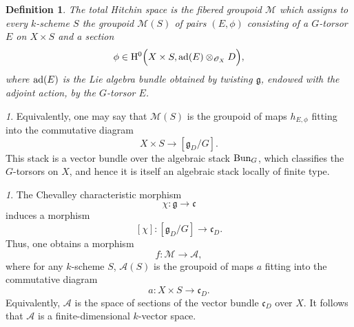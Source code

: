\documentclass[12pt,english]{smfart}
\numberwithin{equation}{subsection}
\newtheorem{definition}[equation]{Definition}
\theoremstyle{remark}
\newtheorem{numero}[equation]{}
\newcommand\calA{{\mathscr A}}
\newcommand\calM{{\mathscr M}}
\newcommand\calO{{\mathscr O}}
\newcommand\frakg{{\mathfrak g}}
\newcommand\frakc{{\mathfrak c}}
\newcommand\rmH{{\rm H}}
\newcommand\ad{{\rm ad}}
\begin{document}
\begin{definition}\label{definition fibration de Hitchin}
The total Hitchin space is the fibered groupoid $\calM$ which assigns to every $k$-scheme $S$ the groupoid $\calM(S)$ of pairs $(E,\phi)$ consisting of a $G$-torsor $E$ on $X\times S$ and a section
$$\phi\in\rmH^0\Bigl(X\times S,\ad(E)\otimes_{\calO_X} D\Bigr),$$
where $\ad(E)$ is the Lie algebra bundle obtained by twisting $\frakg$, endowed with the adjoint action, by the $G$-torsor $E$.
\end{definition}

\begin{numero}
Equivalently, one may say that $\calM(S)$ is the groupoid of maps $h_{E,\phi}$ fitting into the commutative diagram
$$
X\times S \longrightarrow [\frakg_D/ G].
$$
This stack is a vector bundle over the algebraic stack ${\rm Bun}_G$, which classifies the $G$-torsors on $X$, and hence it is itself an algebraic stack locally of finite type.
\end{numero}

\begin{numero}
The Chevalley characteristic morphism
$$\chi:\frakg\longrightarrow \frakc$$
induces a morphism
$$[\chi]:[\frakg_D/G]\longrightarrow \frakc_D.$$
Thus, one obtains a morphism
$$f:\calM\longrightarrow \calA,$$
where for any $k$-scheme $S$, $\calA(S)$ is the groupoid of maps $a$ fitting into the commutative diagram
$$
a: X\times S\longrightarrow \frakc_D.
$$
Equivalently, $\calA$ is the space of sections of the vector bundle $\frakc_D$ over $X$. It follows that $\calA$ is a finite-dimensional $k$-vector space.
\end{numero}
\end{document}
